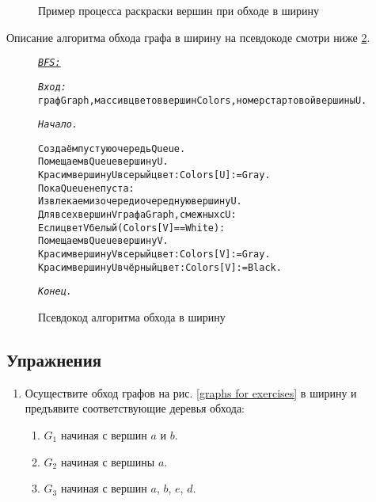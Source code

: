 \begin{figure}[h]
	\center
	\caption{Пример процесса раскраски вершин при обходе в ширину}
	\label{picture: process coloring of the vertices in the BFS}
\end{figure}

Описание алгоритма обхода графа в ширину на псевдокоде смотри ниже \ref{bfs}.

\begin{figure}[h]
	\begin{alltt}
\textit{\underline{BFS:}}

\textit{Вход:}
  граф Graph, массив цветов вершин Colors, номер стартовой вершины U.

\textit{Начало.}

  Создаём пустую очередь Queue.
  Помещаем в Queue вершину U.
  Красим вершину U в серый цвет: Colors[U] := Gray.
  Пока Queue не пуста:
    Извлекаем из очереди очередную вершину U.
    Для всех вершин V графа Graph, смежных с U:
      Если цвет V белый (Colors[V] == White):
        Помещаем в Queue вершину V.
        Красим вершину V в серый цвет: Colors[V] := Gray.
      Красим вершину U в чёрный цвет: Colors[V] := Black.

\textit{Конец.}
	\end{alltt}
	\caption{Псевдокод алгоритма обхода в ширину}
	\label{bfs}
\end{figure}

\subsection{Упражнения}

\begin{enumerate}
	\item Осуществите обход графов на рис. \ref{graphs for exercises} в ширину и предъявите соответствующие деревья обхода:
	\begin{enumerate}
		\item $G_1$ начиная с вершин $a$ и $b$.
		\item $G_2$ начиная с вершины $a$.
		\item $G_3$ начиная с вершин $a$, $b$, $e$, $d$.
	\end{enumerate}
\end{enumerate}

